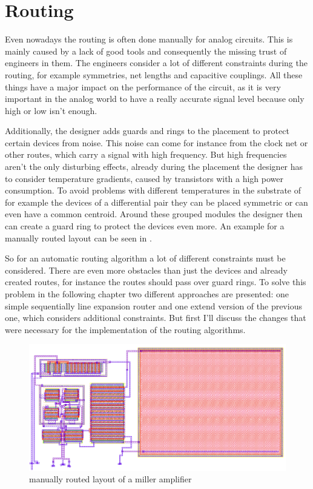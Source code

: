 \chapter{Routing}

Even nowadays the routing is often done manually for analog circuits. This is mainly caused by a lack of good tools and consequently the missing trust of engineers in them. The engineers consider a lot of different constraints during the routing, for example symmetries, net lengths and capacitive couplings. All these things have a major impact on the performance of the circuit, as it is very important in the analog world to have a really accurate signal level because only high or low isn't enough.

Additionally, the designer adds guards and rings to the placement to protect certain devices from noise. This noise can come for instance from the clock net or other routes, which carry a signal with high frequency. But high frequencies aren't the only disturbing effects, already during the placement the designer has to consider temperature gradients, caused by transistors with a high power consumption. To avoid problems with different temperatures in the substrate of for example the devices of a differential pair they can be placed symmetric or can even have a common centroid. Around these grouped modules the designer then can create a guard ring to protect the devices even more. An example for a manually routed layout can be seen in .

So for an automatic routing algorithm a lot of different constraints must be considered. There are even more obstacles than just the devices and already created routes, for instance the routes should pass over guard rings. To solve this problem in the following chapter two different approaches are presented: one simple sequentially line expansion router and one extend version of the previous one, which considers additional constraints. But first I'll  discuss the changes that were necessary for the implementation of the routing algorithms.

\begin{figure}
	\centering
	\includegraphics[scale=.4]{FIG/miller_amplifier_layout_routed.png}
  	\caption{manually routed layout of a miller amplifier}
	\label{fig:miller_amplifier_routed_layout}
\end{figure}

